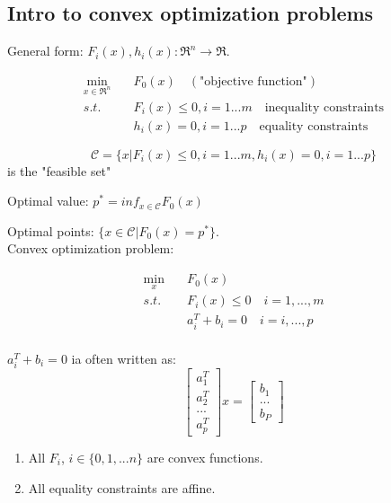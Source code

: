 
\subsection{Intro to convex optimization problems}
General form: $F_i(x), h_i(x): \Re^n\rightarrow \Re$.

\begin{align*}
\min_{x\in \Re^n} \quad &F_0(x) \quad(\text{"objective function"})\\
s.t. \quad &F_i(x) \leq 0, i = 1...m \quad\text{inequality constraints}\\
&h_i(x) =0,i =1...p \quad \text{equality constraints}
\end{align*}


\begin{equation*}
\mathcal{C} = \{x\vert F_i(x) \leq 0,i=1...m,h_i(x) = 0,i = 1...p \}
\end{equation*}
is the "feasible set"

Optimal value: $p^* = inf_{x\in \mathcal{C}}F_0(x)$

Optimal points: $\{x\in \mathcal{C}\vert F_0(x) = p^* \}$.\\

Convex optimization problem: 

\begin{align*}
\min_x \quad &F_0(x) \\
s.t. &F_i(x)\leq 0 \quad i = 1,...,m\\
&a^T_i + b_i = 0\quad i =i,...,p\\
\end{align*}

$a^T_i + b_i = 0$ ia often written as:
\begin{equation*}
\begin{bmatrix}
a_1^T\\
a_2^T\\
...\\
a_p^T
\end{bmatrix}x = 
\begin{bmatrix}
b_1\\
...\\
b_P
\end{bmatrix}
\end{equation*}

\begin{enumerate}
	\item All $F_i$, $i\in \{0,1,...n \}$ are convex functions.
	
	\item All equality constraints are affine.
\end{enumerate}


